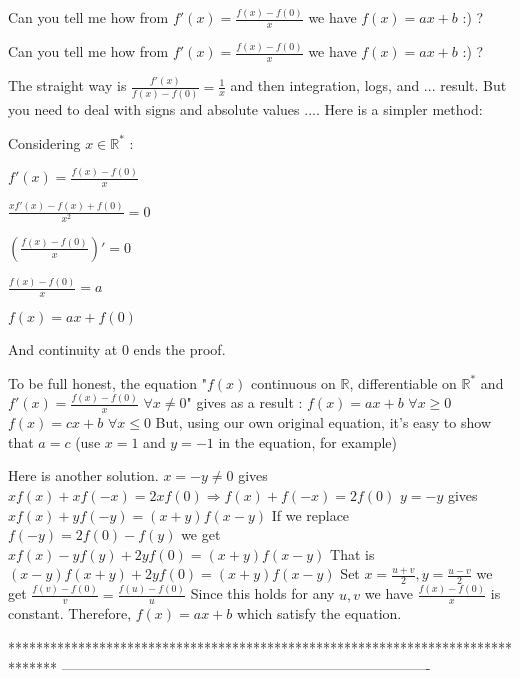 \begin{solution}
	Can you tell me how from
$ f'(x) =\frac{f(x)-f(0)}{x}$
we have $ \boxed{f(x) = ax+b}$ :) ?
\end{solution}



\begin{solution}
	\begin{tcolorbox}Can you tell me how from
$ f'(x) = \frac {f(x) - f(0)}{x}$
we have $ \boxed{f(x) = ax + b}$ :) ?\end{tcolorbox}

The straight way is $ \frac {f'(x)}{f(x) - f(0)} = \frac 1x$ and then integration, logs, and ... result. But you need to deal with signs and absolute values .... Here is a simpler method:

Considering $ x\in\mathbb R^*$ : 

$ f'(x) = \frac {f(x) - f(0)}{x}$

$ \frac {xf'(x) - f(x) + f(0)}{x^2} = 0$

$ (\frac {f(x) - f(0)}{x})' = 0$

$ \frac {f(x) - f(0)}{x} = a$

$ f(x) = ax + f(0)$

And continuity at 0 ends the proof.

To be full honest, the equation "$ f(x)$ continuous on $ \mathbb R$, differentiable on $ \mathbb R^*$ and $ f'(x) = \frac {f(x) - f(0)}{x}$ $ \forall x\ne 0$" gives as a result :
$ f(x) = ax + b$ $ \forall x\ge 0$
$ f(x) = cx + b$ $ \forall x\le 0$
But, using our own original equation, it's easy to show that $ a = c$ (use $ x = 1$ and $ y = - 1$ in the equation, for example)
\end{solution}



\begin{solution}
	Here is another solution.
$ x=-y \neq0$ gives $ xf(x)+xf(-x)=2xf(0) \Longrightarrow f(x)+f(-x)=2f(0)$
$ y=-y$ gives $ xf(x)+yf(-y)=(x+y)f(x-y)$
If we replace $ f(-y)=2f(0)-f(y)$ we get $ xf(x)-yf(y)+2yf(0)=(x+y)f(x-y)$ 
That is $ (x-y)f(x+y)+2yf(0)=(x+y)f(x-y)$
Set $ x=\frac{u+v}{2}, y=\frac{u-v}{2}$ we get 
$ \frac{f(v)-f(0)}{v}=\frac{f(u)-f(0)}{u}$
Since this holds for any $ u,v$ we have $ \frac{f(x)-f(0)}{x}$ is constant. 
Therefore, $ f(x)=ax+b$ which satisfy the equation.
\end{solution}
*******************************************************************************
-------------------------------------------------------------------------------

